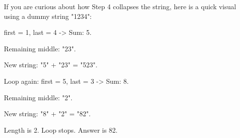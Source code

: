 If you are curious about how Step 4 collapses the string, here is a quick visual using a dummy string "1234":

first = 1, last = 4 -> Sum: 5.

Remaining middle: "23".

New string: "5" + "23" = "523".

Loop again: first = 5, last = 3 -> Sum: 8.

Remaining middle: "2".

New string: "8" + "2" = "82".

Length is 2. Loop stops. Answer is 82.